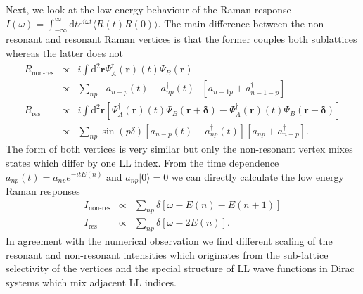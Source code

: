 \documentclass[reprint,amsmath,amssymb,aps,prb,groupedaddress,nofootinbib,superscriptaddress]{revtex4-1}
\newcommand{\1}{\mathds{1}}
\begin{document}
Next, we look at the low energy behaviour of the Raman response $I(\omega)=\int_{-\infty}^{\infty} \text{d}t e^{i\omega t} \langle R(t) R(0)\rangle$. The main difference between the non-resonant and resonant Raman vertices is that the former couples both sublattices whereas the latter does not
\begin{eqnarray}
R_{\text{non-res}} & \propto & i \int \text{d}^2 \mathbf{r}  \Psi^{\dagger}_A(\mathbf{r})(t) \Psi_B(\mathbf{r}) \\ \nonumber
& \propto & \sum_{np} \left[ a_{n-p}(t) -a^{\dagger}_{np} (t) \right] \left[ a_{n-1 p} + a^{\dagger}_{n-1 -p} \right] \\ \nonumber
R_{\text{res}} & \propto & i \int \text{d}^2 \mathbf{r} \left[ \Psi^{\dagger}_A(\mathbf{r})(t) \Psi_B(\mathbf{r+\delta}) - \Psi^{\dagger}_A(\mathbf{r})(t) \Psi_B(\mathbf{r-\delta}) \right] \\ \nonumber
& \propto & \sum_{np} \sin \left(p \delta \right) \left[ a_{n-p}(t) -a^{\dagger}_{np} (t) \right] \left[ a_{n p} + a^{\dagger}_{n -p} \right] .
\end{eqnarray}
The form of both vertices is very similar but only the non-resonant vertex mixes states which differ by one LL index. From the time dependence $a_{np}(t)=a_{np} e^{-i t E(n)}$ and $a_{np} |0\rangle=0$ we can directly calculate the low energy Raman responses
\begin{eqnarray}
I_{\text{non-res}} & \propto &  \sum_{np} \delta\left[\omega - E(n)-E(n+1) \right] \\ \nonumber
I_{\text{res}} & \propto &  \sum_{np} \delta\left[\omega - 2E(n)  \right] .
\end{eqnarray}
In agreement with the numerical observation we find different scaling of the resonant and non-resonant intensities which originates from the sub-lattice selectivity of the vertices and the special structure of LL wave functions in Dirac systems which mix adjacent LL indices. 
\end{document}
